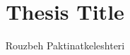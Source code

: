 \documentclass[12pt]{report}          %
\title{Thesis Title} %
\author{Rouzbeh Paktinatkeleshteri}
\newcommand{\onlyinsubfile}[1]{#1}
\newcommand{\notinsubfile}[1]{}
\begin{document}
\renewcommand{\onlyinsubfile}[1]{}
\renewcommand{\notinsubfile}[1]{#1}

\preamblepagenumbering %
\titlepage %



\doublespacing



%






\singlespacing %
               
\tableofcontents
\listoftables  %
\listoffigures %

               
\printnoidxglossaries
               
\doublespacing
\end{document}
